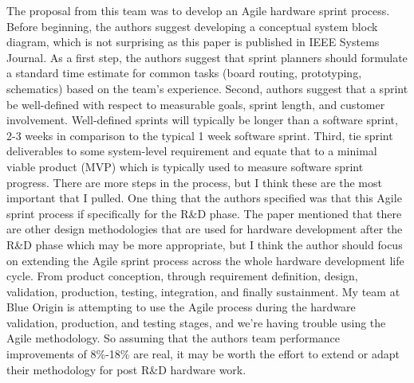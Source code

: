 \documentclass{article}
\begin{document}
The proposal from this team was to develop an Agile hardware sprint process. Before beginning, the authors suggest developing a conceptual system block diagram, which is not surprising as this paper is published in IEEE Systems Journal. 
As a first step, the authors suggest that sprint planners should formulate a standard time estimate for common tasks (board routing, prototyping, schematics) based on the team's experience.
Second, authors suggest that a sprint be well-defined with respect to measurable goals, sprint length, and customer involvement.
Well-defined sprints will typically be longer than a software sprint, 2-3 weeks in comparison to the typical 1 week software sprint.
Third, tie sprint deliverables to some system-level requirement and equate that to a minimal viable product (MVP) which is typically used to measure software sprint progress.
There are more steps in the process, but I think these are the most important that I pulled.
One thing that the authors specified was that this Agile sprint process if specifically for the R\&D phase.
The paper mentioned that there are other design methodologies that are used for hardware development after the R\&D phase which may be more appropriate, but I think the author should focus on extending the Agile sprint process across the whole hardware development life cycle.
From product conception, through requirement definition, design, validation, production, testing, integration, and finally sustainment. 
My team at Blue Origin is attempting to use the Agile process during the hardware validation, production, and testing stages, and we're having trouble using the Agile methodology.
So assuming that the authors team performance improvements of 8\%-18\% are real, it may be worth the effort to extend or adapt their methodology for post R\&D hardware work.


\nocite{*}



\end{document}
